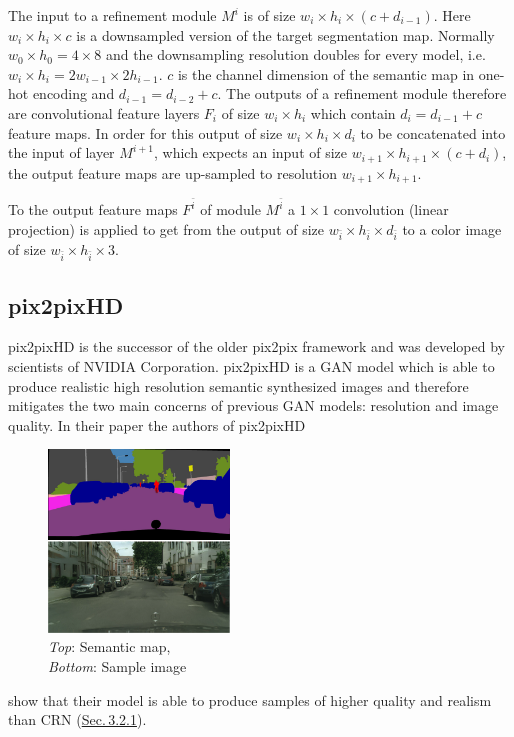 The input to a refinement module $M^i$ is of size $w_i\times h_i\times(c + d_{i-1})$. Here $w_i\times h_i\times c$ is a downsampled version of the target segmentation map. Normally $w_0\times h_0=4\times 8$ and the downsampling resolution doubles for every model, i.e. $w_i\times h_i=2w_{i-1}\times2h_{i-1}$. $c$ is the channel dimension of the semantic map in one-hot encoding and $d_{i-1}=d_{i-2}+c$. The outputs of a refinement module therefore are convolutional feature layers $F_i$ of size $w_i\times h_i$ which contain $d_i=d_{i-1}+c$ feature maps. In order for this output of size $w_i\times h_i\times d_i$ to be concatenated into the input of layer $M^{i+1}$, which expects an input of size $w_{i+1}\times h_{i+1}\times (c + d_i)$, the output feature maps are up-sampled to resolution $w_{i+1}\times h_{i+1}$.

To the output feature maps $F^{\bar{i}}$ of module $M^{\bar{i}}$ a $1\times1$ convolution (linear projection) is applied to get from the output of size $w_{\bar{i}}\times h_{\bar{i}}\times d_{\bar{i}}$ to a color image of size $w_{\bar{i}}\times h_{\bar{i}}\times3$.

\subsection{pix2pixHD} \label{sec:3.2.2}
pix2pixHD \cite{pix2pixHD} is the successor of the older pix2pix \cite{pix2pix} framework and was developed by scientists of NVIDIA Corporation. pix2pixHD is a GAN model which is able to produce realistic high resolution semantic synthesized images and therefore mitigates the two main concerns of previous GAN models: resolution and image quality. In their paper the authors of pix2pixHD 
%
\begin{figure}
    \begin{center}
        \includegraphics[width=0.43\textwidth]{Chapters/figures/pix2pixHD_example.PNG}
    \end{center}
    \caption{\textit{Top}: Semantic map, \\\textit{Bottom}: Sample image}
\end{figure}
%
show that their model is able to produce samples of higher quality and realism than CRN (\hyperref[sec:3.2.1]{Sec.\,3.2.1}).

